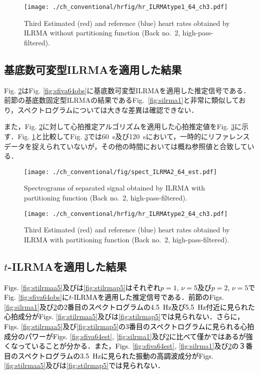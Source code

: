 \begin{figure}[tb]
\centering
\texttt{[image: ./ch\_conventional/hrfig/hr\_ILRMAtype1\_64\_ch3.pdf]}
\caption{Third Estimated (red) and reference (blue) heart rates obtained by ILRMA without partitioning function (Back no.~2, high-pass-filtered).}
\label{fig:hrilrma1}
\end{figure}

\subsection{基底数可変型ILRMAを適用した結果}
\label{sec:conv:resultilrma2}
Fig. \ref{fig:silrma2}はFig. \ref{fig:sfiva64obs}に基底数可変型ILRMAを適用した推定信号である．前節の基底数固定型ILRMAの結果であるFig.~\ref{fig:silrma1}と非常に類似しており，スペクトログラムについては大きな差異は確認できない．

また，Fig. \ref{fig:silrma2}に対して心拍推定アルゴリズムを適用した心拍推定値をFig. \ref{fig:hrilrma2}に示す．Fig. \ref{fig:hrilrma1}と比較してFig. \ref{fig:hrilrma2}では60~s及び120~sにおいて，一時的にリファレンスデータを捉えられていないが，その他の時間においては概ね参照値と合致している．

\begin{figure}[tb]
\centering
\texttt{[image: ./ch\_conventional/fig/spect\_ILRMA2\_64\_est.pdf]}
\caption{Spectrograms of separated signal obtained by ILRMA with partitioning function (Back no.~2, high-pass-filtered).}
\label{fig:silrma2}
\end{figure}

\begin{figure}[tb]
\centering
\texttt{[image: ./ch\_conventional/hrfig/hr\_ILRMAtype2\_64\_ch3.pdf]}
\caption{Third Estimated (red) and reference (blue) heart rates obtained by ILRMA with partitioning function (Back no.~2, high-pass-filtered).}
\label{fig:hrilrma2}
\end{figure}

\subsection{$t$-ILRMAを適用した結果}
\label{sec:conv:resulttilrma}
\textcolor{black}{Figs. \ref{fig:stilrmaa5}及びは\ref{fig:stilrmap5}はそれぞれ$p=1$, $\nu = 5$及び$p=2$, $\nu = 5$でFig. \ref{fig:sfiva64obs}に$t$-ILRMAを適用した推定信号である．前節のFigs. \ref{fig:silrma1}及び\ref{fig:silrma2}の2番目のスペクトログラムの4.5~Hz及び5.5~Hz付近に見られた心拍成分がFigs. \ref{fig:stilrmaa5}及びは\ref{fig:stilrmap5}では見られない．さらに，Figs. \ref{fig:stilrmaa5}及び\ref{fig:stilrmap5}の3番目のスペクトログラムに見られる心拍成分のパワーがFigs. \ref{fig:sfiva64est}, \ref{fig:silrma1}及び\ref{fig:silrma2}に比べて僅かではあるが強くなっていることが分かる．また，Figs. \ref{fig:sfiva64est}, \ref{fig:silrma1}及び\ref{fig:silrma2}の３番目のスペクトログラムの3.5~Hzに見られた振動の高調波成分がFigs. \ref{fig:stilrmaa5}及びは\ref{fig:stilrmap5}では見られない．}

